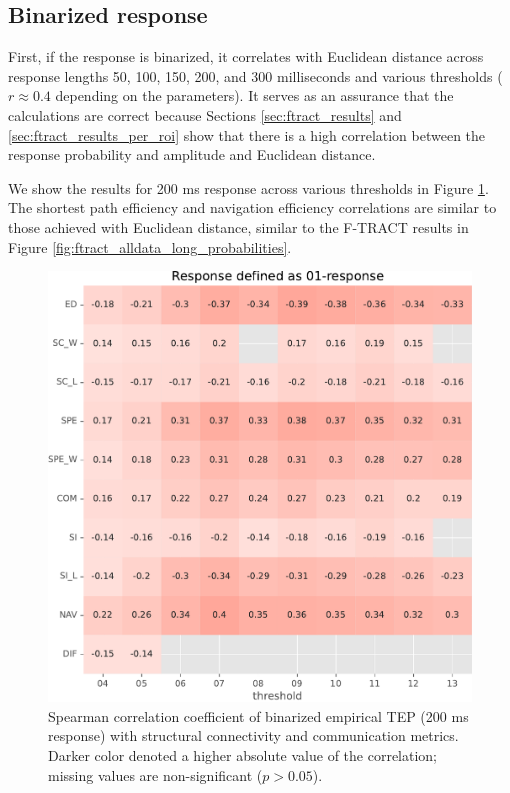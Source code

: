 \subsection{Binarized response}

First, if the response is binarized, it correlates with Euclidean distance across response lengths 50, 100, 150, 200, and 300 milliseconds and various thresholds ($r \approx 0.4$ depending on the parameters). It serves as an assurance that the calculations are correct because Sections \ref{sec:ftract_results} and \ref{sec:ftract_results_per_roi} show that there is a high correlation between the response probability and amplitude and Euclidean distance. 

We show the results for 200 ms response across various thresholds in Figure \ref{fig:tms_01_200}. The shortest path efficiency and navigation efficiency correlations are similar to those achieved with Euclidean distance, similar to the F-TRACT results in Figure \ref{fig:ftract_alldata_long_probabilities}.

\begin{figure}
    \centering
    \includegraphics[width=\textwidth]{images/nootebook_generated/tmseeg_results/empirical/200/not_over_threshold_nan/Response defined as 01-response.pdf}
    \caption[Binarized TEP (200 ms) correlations]{Spearman correlation coefficient of binarized empirical TEP (200 ms response) with structural connectivity and communication metrics. Darker color denoted a higher absolute value of the correlation; missing values are non-significant ($p>0.05$).}
    \label{fig:tms_01_200}
\end{figure}


